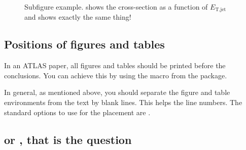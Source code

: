 \begin{figure}[htbp]
  \centering
  \caption{Subfigure example.
    \protect{} shows the cross-section as a function of $E_{\text{T,jet}}$ and 
    \protect{} shows exactly the same thing!}
  \label{fig:subfigexample}
\end{figure}


\subsection{Positions of figures and tables}

In an ATLAS paper, all figures and tables should be printed before the conclusions.
You can achieve this by using the macro  from the
 package.

In general, as mentioned above, you should separate the figure and table environments from the text by blank lines.
This helps the line numbers. The standard options to use for the placement are \Option{[htbp]}.


\subsection{\pT or \ET, that is the question}

